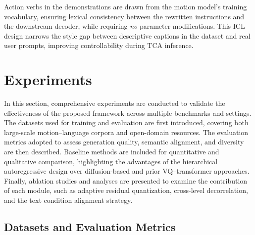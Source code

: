 \documentclass[a4paper,12pt]{article}
\begin{document}
Action verbs in the demonstrations are drawn from the motion model’s training
vocabulary, ensuring lexical consistency between the rewritten instructions and
the downstream decoder, while requiring \emph{no} parameter modifications.
This ICL design narrows the style gap between descriptive captions in the dataset
and real user prompts, improving controllability during TCA inference.


\newpage

\section{Experiments}

In this section, comprehensive experiments are conducted to validate the effectiveness of the proposed framework across multiple benchmarks and settings. The datasets used for training and evaluation are first introduced, covering both large-scale motion–language corpora and open-domain resources. The evaluation metrics adopted to assess generation quality, semantic alignment, and diversity are then described. Baseline methods are included for quantitative and qualitative comparison, highlighting the advantages of the hierarchical autoregressive design over diffusion-based and prior VQ–transformer approaches. Finally, ablation studies and analyses are presented to examine the contribution of each module, such as adaptive residual quantization, cross-level decorrelation, and the text condition alignment strategy.

\subsection{Datasets and Evaluation Metrics}
\label{sec:exp_data}
\end{document}
